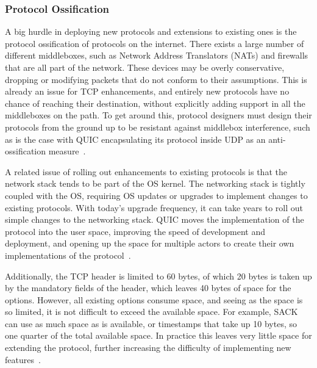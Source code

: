 \documentclass[english, 12pt, a4paper, elec, utf8, a-2b, online]{aaltothesis}
\begin{document}
\subsubsection{Protocol Ossification}
A big hurdle in deploying new protocols and extensions to existing ones
is the protocol ossification of protocols on the internet. There exists a large number of different
middleboxes, such as Network Address Translators (NATs) and firewalls that are all
part of the network. These devices may be overly conservative, dropping or 
modifying packets that do not conform to their assumptions. This is already an
issue for TCP enhancements, and entirely new protocols have no chance of reaching
their destination, without explicitly adding support in all the middleboxes on the path.
To get around this, protocol designers must design their protocols from the ground
up to be resistant against middlebox interference, such as is the case with QUIC encapsulating
its protocol inside UDP as an anti-ossification measure~\cite{Ossification}.

A related issue of rolling out enhancements to existing protocols is that the
network stack tends to be part of the OS kernel. The networking
stack is tightly coupled with the OS, requiring OS updates or upgrades to implement
changes to existing protocols. With today's upgrade frequency, it can take years
to roll out simple changes to the networking stack. QUIC moves the implementation of the 
protocol into the user space, improving the speed of development and deployment,
and opening up the space for multiple actors to create their own implementations of
the protocol~\cite{quic_transport_protocol_design}.

Additionally, the TCP header is limited to 60 bytes, of which 20 bytes is taken
up by the mandatory fields of the header, which leaves 40 bytes of space for the options.
However, all existing options consume space, and seeing as the space is so limited,
it is not difficult to exceed the available space. For example, SACK can use as much
space as is available, or timestamps that take up 10  bytes, so one quarter of
the total available space. In practice this leaves very little space for extending
the protocol, further increasing the difficulty of implementing new features~\cite{ietf-tcpm-tcp-edo-15}.
\end{document}
